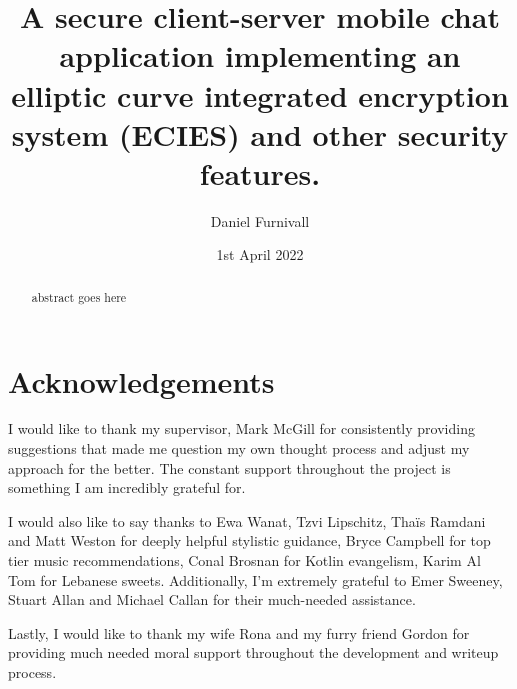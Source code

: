 \documentclass{mproj}
\begin{document}

\title{A secure client-server mobile chat application implementing an elliptic curve integrated encryption system (ECIES) and other security features.}
\author{Daniel Furnivall}
\date{1st April 2022}
\maketitle

\begin{abstract}
abstract goes here
\end{abstract}

\educationalconsent


\newpage
\section*{Acknowledgements}

I would like to thank my supervisor, Mark McGill for consistently providing suggestions that made me question my own thought process and adjust my approach for the better. The constant support throughout the project is something I am incredibly grateful for.

I would also like to say thanks to Ewa Wanat, Tzvi Lipschitz, Thaïs Ramdani and Matt Weston for deeply helpful stylistic guidance, Bryce Campbell for top tier music recommendations, Conal Brosnan for Kotlin evangelism, Karim Al Tom for Lebanese sweets. Additionally, I'm extremely grateful to Emer Sweeney, Stuart Allan and Michael Callan for their much-needed assistance.

Lastly, I would like to thank my wife Rona and my furry friend Gordon for providing much needed moral support throughout the development and writeup process. 

\tableofcontents

\end{document}
